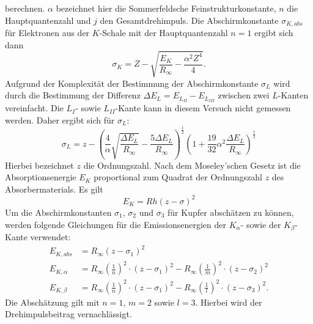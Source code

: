 berechnen. $\alpha$ bezeichnet hier die Sommerfeldsche Feinstrukturkonstante, $n$ die
Hauptquantenzahl und $j$ den Gesamtdrehimpuls.
Die Abschirmkonstante $\sigma_{K, abs}$ für Elektronen aus der $K$-Schale mit
der Hauptquantenzahl $n = 1$ ergibt sich dann
\begin{equation}
  \sigma_K = Z - \sqrt{\frac{E_K}{R_\infty} - \frac{\alpha^2 Z^4}{4}}.
  \label{eqn:abschirmktheorie}
\end{equation}
Aufgrund der Komplexität der Bestimmung der Abschirmkonstante $\sigma_L$ wird durch
die Bestimmung der Differenz $\Delta E_L = E_{L_{II}} - E_{L_{III}}$ zwischen
zwei $L$-Kanten vereinfacht. Die $L_{I}$- sowie $L_{II}$-Kante kann in diesem
Versuch nicht gemessen werden. Daher ergibt sich für $\sigma_L$:
\begin{equation}
  \sigma_L = z - \left( \frac{4}{\alpha} \sqrt{\frac{\Delta E_L}{R_{\infty}}} - \frac{5 \Delta E_L}{R_{\infty}} \right)^{\frac{1}{2}} \left( 1 + \frac{19}{32} \alpha^2 \frac{\Delta E_L}{R_{\infty}} \right)^{\frac{1}{2}}
  \label{eqn:sigmaktheorie}
\end{equation}
Hierbei bezeichnet $z$ die Ordnungszahl.
Nach dem Moseley'schen Gesetz ist die Absorptionsenergie $E_K$ proportional zum Quadrat der Ordnungszahl $z$ des Absorbermaterials.
    Es gilt
    \begin{equation}
        E_K = R h (z - \sigma)^2
        \label{eqn:Moseley}
    \end{equation}
Um die Abschirmkonstanten $\sigma_1$, $\sigma_2$ und $\sigma_3$ für Kupfer
abschätzen zu können, werden folgende Gleichungen für die Emissionsenergien der
$K_\alpha$- sowie der $K_\beta$-Kante verwendet:
\begin{align}
  E_{K, abs}    & = R_{\infty} (z - \sigma_1)^2 
  \label{eqn:8}\\
  E_{K, \alpha} & = R_{\infty} \left( \frac{1}{n} \right)^2 \cdot (z - \sigma_1)^2 - R_{\infty} \left( \frac{1}{m}\right)^2 \cdot (z - \sigma_2)^2 
  \label{eqn:9}\\
  E_{K, \beta}  & = R_{\infty} \left( \frac{1}{n}\right)^2 \cdot (z - \sigma_1)^2 - R_{\infty} \left( \frac{1}{l} \right)^2 \cdot (z - \sigma_3)^2 .
  \label{eqn:10}
\end{align}
Die Abschätzung gilt mit $n=1$, $m=2$ sowie $l=3$. Hierbei wird der
Drehimpulsbeitrag vernachlässigt.

